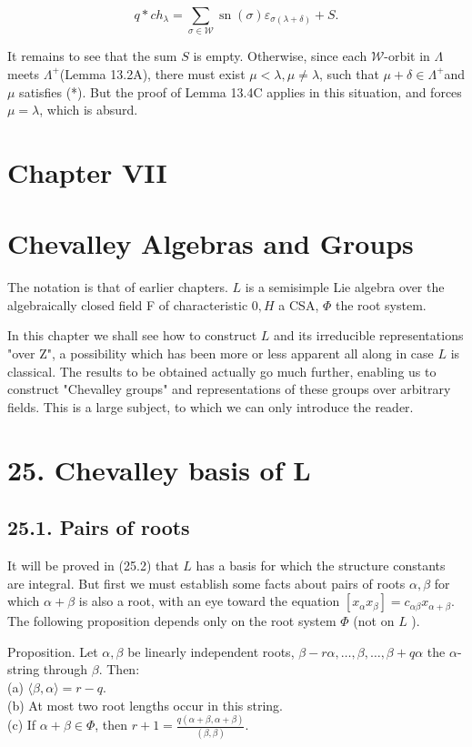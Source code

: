 \documentclass[10pt]{article}
\begin{document}
$$
q * c h_{\lambda}=\sum_{\sigma \in \mathscr{W}} \operatorname{sn}(\sigma) \varepsilon_{\sigma(\lambda+\delta)}+S .
$$

It remains to see that the sum $S$ is empty. Otherwise, since each $\mathscr{W}$-orbit in $\Lambda$ meets $\Lambda^{+}$(Lemma 13.2A), there must exist $\mu<\lambda, \mu \neq \lambda$, such that $\mu+\delta \in \Lambda^{+}$and $\mu$ satisfies (*). But the proof of Lemma 13.4C applies in this situation, and forces $\mu=\lambda$, which is absurd.

\section*{Chapter VII}
\section*{Chevalley Algebras and Groups}
The notation is that of earlier chapters. $L$ is a semisimple Lie algebra over the algebraically closed field F of characteristic $0, H$ a CSA, $\Phi$ the root system.

In this chapter we shall see how to construct $L$ and its irreducible representations "over Z", a possibility which has been more or less apparent all along in case $L$ is classical. The results to be obtained actually go much further, enabling us to construct "Chevalley groups" and representations of these groups over arbitrary fields. This is a large subject, to which we can only introduce the reader.

\section*{25. Chevalley basis of $\boldsymbol{L}$}
\subsection*{25.1. Pairs of roots}
It will be proved in (25.2) that $L$ has a basis for which the structure constants are integral. But first we must establish some facts about pairs of roots $\alpha, \beta$ for which $\alpha+\beta$ is also a root, with an eye toward the equation $\left[x_{\alpha} x_{\beta}\right]=c_{\alpha \beta} x_{\alpha+\beta}$. The following proposition depends only on the root system $\Phi$ (not on $L$ ).

Proposition. Let $\alpha, \beta$ be linearly independent roots, $\beta-r \alpha, \ldots, \beta, \ldots, \beta+q \alpha$ the $\alpha$-string through $\beta$. Then:\\
(a) $\langle\beta, \alpha\rangle=r-q$.\\
(b) At most two root lengths occur in this string.\\
(c) If $\alpha+\beta \in \Phi$, then $r+1=\frac{q(\alpha+\beta, \alpha+\beta)}{(\beta, \beta)}$.
\end{document}
